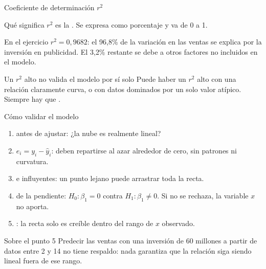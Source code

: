\documentclass[aspectratio=169,10pt]{beamer}
\begin{document}

\begin{frame}{Coeficiente de determinación $r^{2}$}
  \begin{block}{Qué significa}
    \small
    $r^{2}$ es la . Se expresa como porcentaje y va de 0 a 1.
  \end{block}

  \vspace{0.2cm}
  \begin{exampleblock}{En el ejercicio}
    \footnotesize
    $r^{2}=0{,}9682$: el 96{,}8\% de la variación en las ventas se explica
    por la inversión en publicidad. El 3{,}2\% restante se debe a otros
    factores no incluidos en el modelo.
  \end{exampleblock}

  \vspace{0.15cm}
  \begin{alertblock}{Un $r^{2}$ alto no valida el modelo por sí solo}
    \footnotesize
    Puede haber un $r^{2}$ alto con una relación claramente curva, o con datos
    dominados por un solo valor atípico. Siempre hay que .
  \end{alertblock}
\end{frame}

\begin{frame}{Cómo validar el modelo}
  \small
  \begin{enumerate}
    \item {} antes de ajustar: ¿la nube es
          realmente lineal?
    \item {} $e_i=y_i-\hat{y}_i$: deben repartirse al
          azar alrededor de cero, sin patrones ni curvatura.
    \item {} e influyentes: un punto lejano puede
          arrastrar toda la recta.
    \item {} de la pendiente:
          $H_0:\beta_1=0$ contra $H_1:\beta_1\neq 0$. Si no se rechaza, la
          variable $x$ no aporta.
    \item {}: la recta solo es creíble dentro del rango de
          $x$ observado.
  \end{enumerate}

  \vspace{0.2cm}
  \begin{alertblock}{Sobre el punto 5}
    \footnotesize
    Predecir las ventas con una inversión de 60 millones a partir de datos
    entre 2 y 14 no tiene respaldo: nada garantiza que la relación siga siendo
    lineal fuera de ese rango.
  \end{alertblock}
\end{frame}
\end{document}
